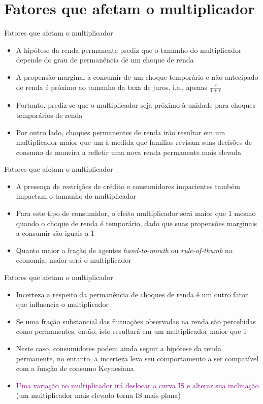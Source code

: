 \documentclass[10pt]{beamer}
\begin{document}
\section{Fatores que afetam o multiplicador}
\begin{frame}
    {Fatores que afetam o multiplicador}
    \begin{itemize}
        \item A hipótese da renda permanente prediz que o tamanho do multiplicador depende do grau de permanência de um choque de renda\bigskip
        \item A propensão marginal a consumir de um choque temporário e não-antecipado de renda é próximo ao tamanho da taxa de juros, i.e., apenas $\frac{r}{1 + r}$\bigskip
        \item Portanto, prediz-se que o multiplicador seja próximo à unidade para choques temporários de renda\bigskip
        \item Por outro lado, choques permanentes de renda irão resultar em um multiplicador maior que um à medida que famílias revisam suas decisões de consumo de maneira a refletir uma nova renda permanente mais elevada
    \end{itemize}
\end{frame}

\begin{frame}
    {Fatores que afetam o multiplicador}
    \begin{itemize}
        \item A presença de restrições de crédito e consumidores impacientes também impactam o tamanho do multiplicador\bigskip
        \item Para este tipo de consumidor, o efeito multiplicador será maior que 1 mesmo quando o choque de renda é temporário, dado que suas propensões marginais a consumir são iguais a 1\bigskip
        \item Quanto maior a fração de agentes \emph{hand-to-mouth} ou \emph{rule-of-thumb} na economia, maior será o multiplicador
    \end{itemize}
\end{frame}

\begin{frame}
    {Fatores que afetam o multiplicador}
    \begin{itemize}
        \item Incerteza a respeito da permanência de choques de renda é um outro fator que influencia o multiplicador\bigskip
        \item Se uma fração substancial das flutuações observadas na renda são percebidas como permanentes, então, isto resultará em um multiplicador maior que 1\bigskip
        \item Neste caso, consumidores podem ainda seguir a hipótese da renda permanente, no entanto, a incerteza leva seu comportamento a ser compatível com a função de consumo Keynesiana\bigskip
        \item \textcolor{purple}{Uma variação no multiplicador irá deslocar a curva IS e alterar sua inclinação} (um multiplicador mais elevado torna IS mais plana)
    \end{itemize}
\end{frame}
\end{document}
